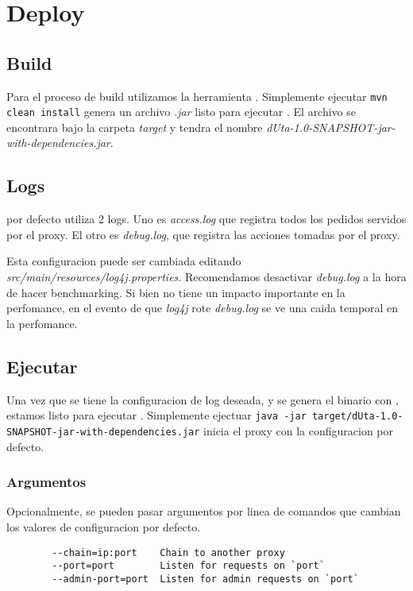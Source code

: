 \documentclass[11pt,a4paper,titlepage]{article}
\begin{document}
\section{Deploy}
    \subsection{Build}
    Para el proceso de build utilizamos la herramienta .
    Simplemente ejecutar \texttt{mvn clean install} genera un archivo \textit{.jar} listo para ejecutar \duta.
    El archivo se encontrara bajo la carpeta \textit{target} y tendra el nombre \textit{dUta-1.0-SNAPSHOT-jar-with-dependencies.jar}.

    \subsection{Logs}
    \duta por defecto utiliza 2 logs.
    Uno es \textit{access.log} que registra todos los pedidos servidos por el proxy.
    El otro es \textit{debug.log}, que registra las acciones tomadas por el proxy.

    Esta configuracion puede ser cambiada editando \textit{src/main/resources/log4j.properties}.
    Recomendamos desactivar \textit{debug.log} a la hora de hacer benchmarking.
    Si bien no tiene un impacto importante en la perfomance, en el evento de que \textit{log4j} rote \textit{debug.log} se ve una caida temporal en la perfomance.

    \subsection{Ejecutar \duta}
    Una vez que se tiene la configuracion de log deseada, y se genera el binario con , estamos listo para ejecutar \duta.
    Simplemente ejectuar \texttt{java -jar target/dUta-1.0-SNAPSHOT-jar-with-dependencies.jar} inicia el proxy con la configuracion por defecto.

    \subsubsection{Argumentos}
    Opcionalmente, se pueden pasar argumentos por linea de comandos que cambian los valores de configuracion por defecto.
    \begin{verbatim}
        --chain=ip:port    Chain to another proxy
        --port=port        Listen for requests on `port`
        --admin-port=port  Listen for admin requests on `port`
    \end{verbatim}
\end{document}
